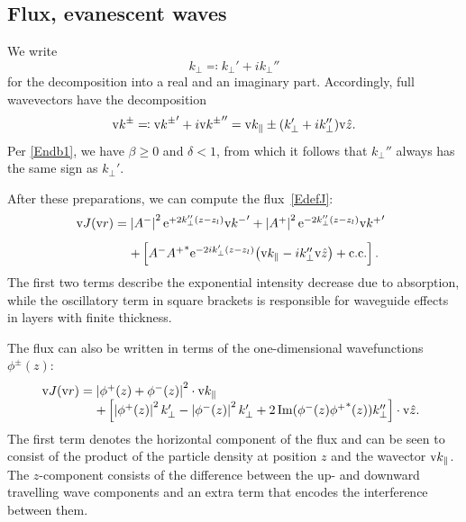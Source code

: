\subsection{Flux, evanescent waves}\label{SSpecial}

We write
\begin{equation}\label{Edecompkperp}
  k_\perp \eqqcolon k_\perp' + i k_\perp''
\end{equation}
for the decomposition into a real and an imaginary part.
Accordingly, full wavevectors have the decomposition
\begin{equation}
  \text{v}{k}^\pm
  \eqqcolon {\text{v}{k}^\pm}' + i{\text{v}{k}^\pm}''
  = \text{v}{k}_\parallel \pm (k_\perp' + i k_\perp'')\text{v}{\hat z}.
\end{equation}
Per \cref{Endb1}, we have $\beta\ge0$ and $\delta<1$,
from which it follows that $k_\perp''$ always has the same sign as $k_\perp'$.

After these preparations,
we can compute the flux~\cref{EdefJ}:
\begin{equation}\label{EJ1}
  \begin{array}{@{}l@{\;}l}
  \v{J}(\r)
  =&   \left|A^-\right|^2 \e^{+2k_\perp'' (z-z_l)} {\k^-}'
    + \left|A^+\right|^2 \e^{-2k_\perp''(z-z_l)} {\k^+}'
\\[2ex]
  &+ \left[
      A^-{A^+}^* \e^{-2ik_\perp'(z-z_l)} {\left(\k_\plll-ik_\perp''\v{\hat z}\right)}
    + \text{c.c.}
    \right].
  \end{array}
\end{equation}
The first two terms describe the exponential intensity decrease
due to absorption, while
the oscillatory term in square brackets
is responsible for waveguide effects in layers with finite thickness.

The flux can also be written in terms of the one-dimensional wavefunctions $\phi^{\pm}(z)$:
\begin{equation}\label{EJ2}
  \begin{array}{@{}l@{\;}l}
  \v{J}(\r) =& \left|\phi^+(z)+\phi^-(z)\right|^2\cdot\k_\plll \\
  &+ \left[ \left|\phi^+(z)\right|^2 k_\perp' - \left|\phi^-(z)\right|^2 k_\perp' +
  2\Im(\phi^-(z){\phi^+}^*(z))k_\perp'' \right]\cdot \v{\hat z}.
  \end{array}
\end{equation}
The first term denotes the horizontal component
of the flux and can be seen to consist of the product
of the particle density at position $z$ and the wavector $\text{v}{k}_\parallel$.
The $z$-component consists of the difference
between the up- and downward travelling wave components
and an extra term that encodes the interference between them.

